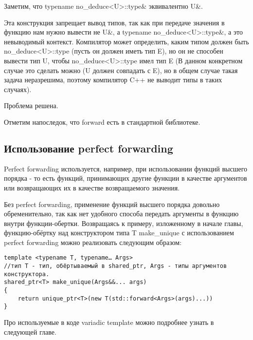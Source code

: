 	Заметим, что typename no\_deduce<U>::type\& эквивалентно U\&.

	Эта конструкция запрещает вывод типов, так как при передаче значения в функцию нам нужно вывести не U\&, а typename no\_deduce<U>::type\&, а это невыводимый контекст. Компилятор может определить, каким типом должен быть no\_deduce<U>::type (пусть он должен иметь тип E), но он не способен вывести тип U, чтобы no\_deduce<U>::type имел тип E (В данном конкретном случае это сделать можно (U должен совпадать с E), но в общем случае такая задача неразрешима, поэтому компилятор C++ не выводит типы в таких случаях).

	Проблема решена.

	Отметим напоследок, что forward есть в стандартной библиотеке.

\subsection{Использование perfect forwarding}

	Perfect forwarding используется, например, при использовании функций высшего порядка - то есть функций, принимающих другие функции в качестве аргументов или возвращающих их в качестве возвращаемого значения.

	Без perfect forwarding, применение функций высшего порядка довольно обременительно, так как нет удобного способа передать аргументы в функцию внутри функции-обертки.
	Возвращаясь к примеру, изложенному в начале главы, функцию-обёртку над конструктором типа T make\_unique с использованием perfect forwarding  можно реализовать следующим образом:

\begin{verbatim}
template <typename T, typename… Args>
//тип T - тип, обёртываемый в shared_ptr, Args - типы аргументов конструктора.
shared_ptr<T> make_unique(Args&&... args)
{
    return unique_ptr<T>(new T(std::forward<Args>(args)...))
}
\end{verbatim}

	Про используемые в коде variadic template можно подробнее узнать в следующей главе.
